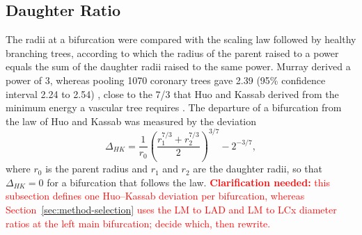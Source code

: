 \providecommand{\clarify}[1]{\textcolor{red}{\textbf{Clarification needed:} #1}}
\subsection{Daughter Ratio}
\label{sec:method-ratio}

The radii at a bifurcation were compared with the scaling law followed by healthy branching trees,
according to which the radius of the parent raised to a power equals the sum of the daughter radii
raised to the same power.
Murray derived a power of 3, whereas pooling 1070 coronary trees gave 2.39 (95\% confidence interval
2.24 to 2.54) \cite{taylor2024murray}, close to the 7/3 that Huo and Kassab derived from the minimum
energy a vascular tree requires \cite{huo2012scaling}.
The departure of a bifurcation from the law of Huo and Kassab was measured by the deviation
\begin{equation}
  \Delta_{HK} = \frac{1}{r_0}\left(\frac{r_1^{7/3} + r_2^{7/3}}{2}\right)^{3/7} - 2^{-3/7},
  \label{eq:method-hk}
\end{equation}
where $r_0$ is the parent radius and $r_1$ and $r_2$ are the daughter radii, so that
$\Delta_{HK} = 0$ for a bifurcation that follows the law.
\clarify{this subsection defines one Huo--Kassab deviation per bifurcation, whereas Section~\ref{sec:method-selection} uses the LM to LAD and LM to LCx diameter ratios at the left main bifurcation; decide which, then rewrite.}

